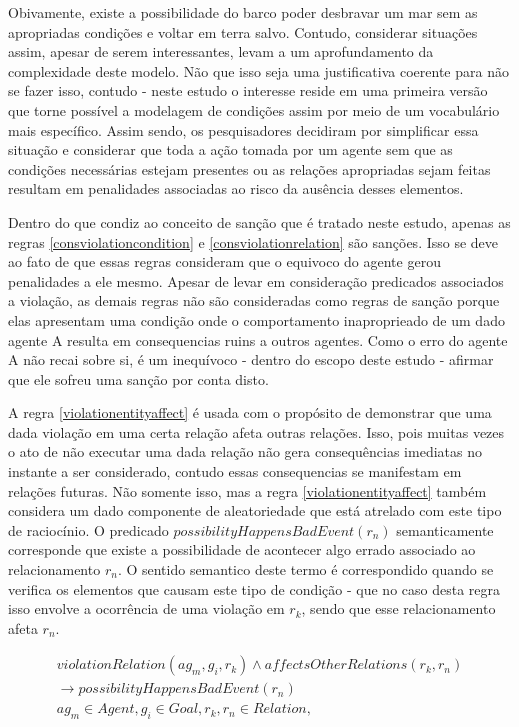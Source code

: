 Obivamente, existe a possibilidade do barco poder desbravar
um mar sem as apropriadas condições e voltar em terra salvo. Contudo, considerar situações assim, apesar de serem interessantes, levam a um aprofundamento 
da complexidade deste modelo. Não que isso seja uma justificativa coerente para não se fazer isso, contudo - neste estudo o interesse reside em uma 
primeira versão que torne possível a modelagem de condições assim por meio de um vocabulário mais específico. Assim sendo, os pesquisadores decidiram 
por simplificar essa situação e considerar que toda a ação tomada por um agente sem que as condições necessárias estejam presentes ou as relações apropriadas 
sejam feitas resultam em penalidades associadas ao risco da ausência desses elementos.  

Dentro do que condiz ao conceito de sanção que é tratado neste estudo, apenas as regras \ref{consviolationcondition} e \ref{consviolationrelation} são sanções. 
Isso se deve ao fato de que essas regras consideram que o equivoco do agente gerou penalidades a ele mesmo. Apesar de levar em consideração predicados associados 
a violação, as demais regras não são consideradas como regras de sanção porque elas apresentam uma condição onde o comportamento inaproprieado de um dado 
agente A resulta em consequencias ruins a outros agentes. Como o erro do agente A não recai sobre si, é um inequívoco - dentro do escopo deste estudo - afirmar 
que ele sofreu uma sanção por conta disto. 


A regra \ref{violationentityaffect} é usada com o propósito de demonstrar que uma dada violação em uma certa relação afeta outras relações. Isso, pois 
muitas vezes o ato de não executar uma dada relação não gera consequências imediatas no instante a ser considerado, contudo essas consequencias se 
manifestam em relações futuras. Não somente isso, mas a regra \ref{violationentityaffect} também considera um dado componente de 
aleatoriedade que está atrelado com este tipo de raciocínio. O predicado $possibilityHappensBadEvent(r_n)$ semanticamente corresponde que existe a possibilidade 
de acontecer algo errado associado ao relacionamento $r_n$. O sentido semantico deste termo é correspondido quando se verifica os elementos que 
causam este tipo de condição - que no caso desta regra isso envolve a ocorrência de uma violação em $r_k$, sendo que esse relacionamento afeta $r_n$.


\begin{eqnarray}\label{violationentityaffect}
	violationRelation(ag_m,g_i,r_k) \wedge affectsOtherRelations(r_k,r_n) \nonumber \\
    \to possibilityHappensBadEvent(r_n)  \nonumber \\
    ag_m \in Agent, g_i \in Goal, r_k,r_n \in Relation, 
\end{eqnarray}

